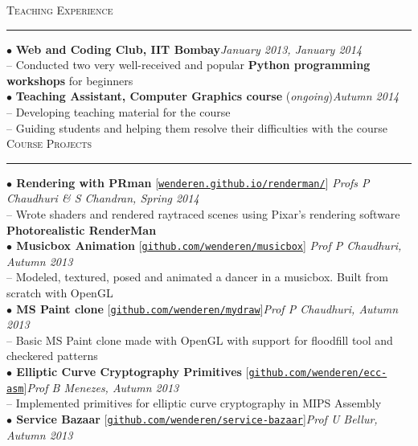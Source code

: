 \documentclass[a4paper,9pt]{article}
\begin{document}
\Large{\textsc{Teaching Experience}}\vspace{1.5pt}
\hrule\vspace{0.25cm}
\small
$\bullet$ \textbf{Web and Coding Club, IIT Bombay}\hfill \textit{January 2013, January 2014}\\
-- Conducted two very well-received and popular \textbf{Python programming workshops} for beginners\\
$\bullet$ \textbf{Teaching Assistant, Computer Graphics course} (\textit{ongoing})\hfill \textit{Autumn 2014}\\
-- Developing teaching material for the course\\
-- Guiding students and helping them resolve their difficulties with the course\\

\Large{\textsc{Course Projects}}\vspace{1.5pt}
\hrule\vspace{0.25cm}
\small
\textbf{$\bullet$ Rendering with PRman} [\href{https://wenderen.github.io/renderman/}{\texttt{wenderen.github.io/renderman/}}] \hfill \textit{Profs P Chaudhuri \& S Chandran, Spring 2014}\\
-- Wrote shaders and rendered raytraced scenes using Pixar's rendering software \textbf{Photorealistic RenderMan}\\
\textbf{$\bullet$ Musicbox Animation} [\href{https://github.com/wenderen/musicbox}{\texttt{github.com/wenderen/musicbox}}] \hfill \textit{Prof P Chaudhuri, Autumn 2013}\\
-- Modeled, textured, posed and animated a dancer in a musicbox. Built from scratch with OpenGL\\
\textbf{$\bullet$ MS Paint clone} [\href{https://github.com/wenderen/mydraw}{\texttt{github.com/wenderen/mydraw}}]\hfill \textit{Prof P Chaudhuri, Autumn 2013}\\
-- Basic MS Paint clone made with OpenGL with support for floodfill tool and checkered patterns\\
\textbf{$\bullet$ Elliptic Curve Cryptography Primitives} [\href{https://github.com/wenderen/ecc-asm}{\texttt{github.com/wenderen/ecc-asm}}]\hfill \textit{Prof B Menezes, Autumn 2013}\\
-- Implemented primitives for elliptic curve cryptography in MIPS Assembly\\
\textbf{$\bullet$ Service Bazaar} [\href{https://github.com/wenderen/service-bazaar}{\texttt{github.com/wenderen/service-bazaar}}]\hfill \textit{Prof U Bellur, Autumn 2013}\\
\end{document}
